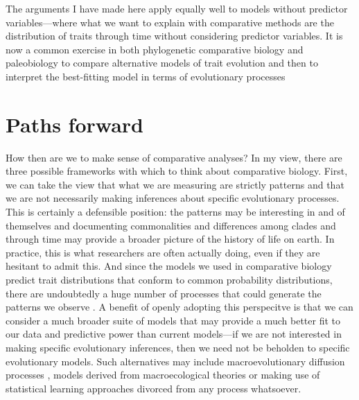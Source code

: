 The arguments I have made here apply equally well to models without predictor variables---where what we want to explain with comparative methods are the distribution of traits through time without considering predictor variables. It is now a common exercise in both phylogenetic comparative biology and paleobiology to compare alternative models of trait evolution and then to interpret the best-fitting model in terms of evolutionary processes \citep[e.g.,][]{Mooers1999, Hunt2007, Harmon2010, Hopkins2012, Burbrink2012, Hunt2012}

\section{Paths forward}

How then are we to make sense of comparative analyses? In my view, there are three possible frameworks with which to think about comparative biology. First, we can take the view that what we are measuring are strictly patterns and that we are not necessarily making inferences about specific evolutionary processes. This is certainly a defensible position: the patterns may be interesting in and of themselves and documenting commonalities and differences among clades and through time may provide a broader picture of the history of life on earth. In practice, this is what researchers are often actually doing, even if they are hesitant to admit this. And since the models we used in comparative biology predict trait distributions that conform to common probability distributions, there are undoubtedly a huge number of processes that could generate the patterns we observe \citep{Jaynes2003, Frank2009, Frank2014}.
A benefit of openly adopting this perspecitve is that we can consider a much broader suite of models that may provide a much better fit to our data and predictive power than current models---if we are not interested in making specific evolutionary inferences, then we need not be beholden to specific evolutionary models. Such alternatives may include macroevolutionary diffusion processes \citep[e.g.,][]{Clauset2008}, models derived from macroecological theories \citep{Brown2004, Harte2011} or making use of statistical learning approaches divorced from any process whatsoever.

